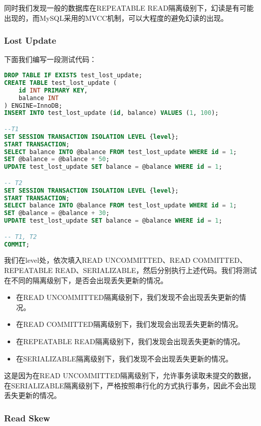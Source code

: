 \documentclass{article}
\begin{document}
同时我们发现一般的数据库在REPEATABLE READ隔离级别下，幻读是有可能出现的，而MySQL采用的MVCC机制，可以大程度的避免幻读的出现。

\subsubsection{Lost Update}

下面我们编写一段测试代码：

\begin{lstlisting}[language=sql]
DROP TABLE IF EXISTS test_lost_update;
CREATE TABLE test_lost_update (
    id INT PRIMARY KEY,
    balance INT
) ENGINE=InnoDB;
INSERT INTO test_lost_update (id, balance) VALUES (1, 100);

--T1
SET SESSION TRANSACTION ISOLATION LEVEL {level};
START TRANSACTION;
SELECT balance INTO @balance FROM test_lost_update WHERE id = 1;
SET @balance = @balance + 50;
UPDATE test_lost_update SET balance = @balance WHERE id = 1;

-- T2 
SET SESSION TRANSACTION ISOLATION LEVEL {level};
START TRANSACTION;
SELECT balance INTO @balance FROM test_lost_update WHERE id = 1;
SET @balance = @balance + 30;
UPDATE test_lost_update SET balance = @balance WHERE id = 1;

-- T1, T2
COMMIT;
\end{lstlisting}

我们在{level}处，依次填入READ UNCOMMITTED、READ COMMITTED、REPEATABLE READ、SERIALIZABLE，然后分别执行上述代码。我们将测试在不同的隔离级别下，是否会出现丢失更新的情况。

\begin{itemize}
    \item 在READ UNCOMMITTED隔离级别下，我们发现不会出现丢失更新的情况。
    \item 在READ COMMITTED隔离级别下，我们发现会出现丢失更新的情况。
    \item 在REPEATABLE READ隔离级别下，我们发现会出现丢失更新的情况。
    \item 在SERIALIZABLE隔离级别下，我们发现不会出现丢失更新的情况。
\end{itemize}

这是因为在READ UNCOMMITTED隔离级别下，允许事务读取未提交的数据，在SERIALIZABLE隔离级别下，严格按照串行化的方式执行事务，因此不会出现丢失更新的情况。

\subsubsection{Read Skew}
\end{document}
